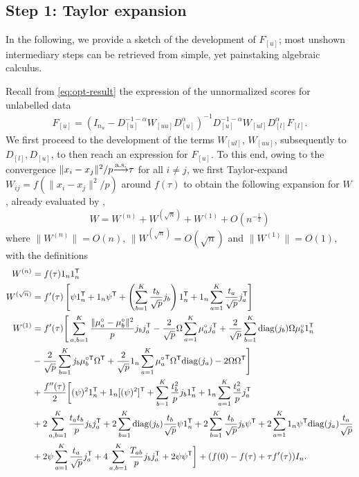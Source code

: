 \documentclass[twoside,11pt]{article}
\def\trans{{\sf T}}
\def\asto{ {\overset{\rm a.s.}{\longrightarrow}} }
\def\ftau{f(\tau)}
\def\fftau{f'(\tau)}
\def\ffftau{f''(\tau)}
\def\muctra{\mu_a^{\circ}}
\def\muctrb{\mu_b^{\circ}}
\begin{document}
\subsection{Step 1: Taylor expansion}
In the following, we provide a sketch of the development of $F_{[u]}$; most unshown intermediary steps can be retrieved from simple, yet painstaking algebraic calculus.

Recall from \eqref{eq:opt-result} the expression of the unnormalized scores for unlabelled data
\begin{align*}
	F_{[u]}=(I_{n_{u}}-D_{[u]}^{-1-\alpha}W_{[uu]}D_{[u]}^{\alpha})^{-1}D_{[u]}^{-1-\alpha}W_{[ul]}D_{[l]}^{\alpha}F_{[l]}.
\end{align*}
We first proceed to the development of the terms $W_{[ul]}$, $W_{[uu]}$, subsequently to $D_{[l]},D_{[u]}$, to then reach an expression for $F_{[u]}$. To this end, owing to the convergence $\|x_i-x_j\|^2/p\asto \tau$ for all $i\neq j$, we first Taylor-expand $W_{ij}=f(\| x_{i}-x_{j}\|^2/p)$ around $f(\tau)$ to obtain the following expansion for $W$, already evaluated by \citet{couillet2015kernel},
\begin{equation}
	\label{eq:W}
	W = W^{(n)}+W^{(\sqrt{n})}+W^{(1)}+O(n^{-\frac{1}{2}})
\end{equation}
where $\|W^{(n)}\|=O(n)$, $\|W^{(\sqrt{n})}=O(\sqrt{n})$ and $\|W^{(1)}\|=O(1)$, with the definitions
\begin{align*}
	W^{(n)}&=\ftau1_{n}1_{n}^\trans \\
	W^{(\sqrt{n})} &=\fftau\left[\psi 1_{n}^\trans+1_{n}\psi^\trans+\left(\sum_{b=1}^{K}\frac{t_{b}}{\sqrt{p}}j_{b}\right)1_{n}^\trans+1_{n}\sum_{a=1}^{K}\frac{t_{a}}{\sqrt{p}}j_{a}^\trans\right]\\
	W^{(1)}&=\fftau\Bigg[\sum_{a,b=1}^{K}\frac{\|\muctra-\muctrb\|^2}{p}j_{b}j_{a}^\trans-\frac{2}{\sqrt{p}}\Omega \sum_{a=1}^{K}\muctra j_{a}^\trans+\frac{2}{\sqrt{p}}\sum_{b=1}^{K}{\rm diag}(j_{b})\Omega \muctrb 1_n^\trans\nonumber\\
	&-\frac{2}{\sqrt{p}}\sum_{b=1}^{K}j_{b}\mu_{b}^{\circ \trans}\Omega^\trans+\frac{2}{\sqrt{p}}1_{n}\sum_{a=1}^{K}{\muctra}^\trans\Omega^\trans {\rm diag}(j_{a})-2\Omega\Omega^\trans\Bigg]\nonumber\\
	&+\frac{\ffftau}{2}\bigg[(\psi)^21_{n}^\trans+1_{n}[(\psi)^2]^\trans+\sum_{b=1}^{K}\frac{t_b^2}{p}j_{b} 1_n^\trans+1_{n}\sum_{a=1}^{K}\frac{t_a^2}{p}j_{a}^\trans \nonumber\\
	&+2\sum_{a,b=1}^{K}\frac{t_{a}t_{b}}{p}j_{b}j_{a}^\trans+2\sum_{b=1}^{K}{\rm diag}(j_{b})\frac{t_{b}}{\sqrt{p}}\psi 1_{n}^\trans+2\sum_{b=1}^{K}\frac{t_{b}}{\sqrt{p}}j_{b}\psi^\trans+2\sum_{a=1}^{K}1_{n}\psi^\trans {\rm diag}(j_{a})\frac{t_{a}}{\sqrt{p}}\nonumber\\
    &+2\psi \sum_{a=1}^{K}\frac{t_{a}}{\sqrt{p}}j_{a}^\trans+4\sum_{a,b=1}^{K}\frac{T_{ab}}{p}j_{b}j_{a}^\trans+2\psi\psi^\trans \bigg]+(f(0)-\ftau+\tau\fftau)I_{n}.
	\end{align*}
\end{document}
